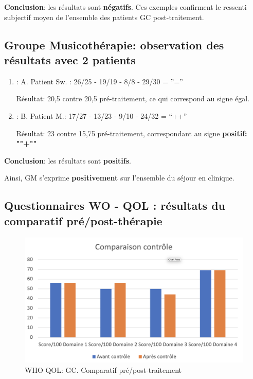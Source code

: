        \textbf{ Conclusion}: les résultats sont \textbf{négatifs}.
        Ces exemples confirment
        le ressenti subjectif moyen de l'ensemble des patients
        GC post-traitement.
        \subsection{Groupe Musicothérapie: observation des résultats avec 2 patients}


\begin{enumerate}
 		\item : A. Patient Sw. : 26/25 - 19/19 - 8/8 - 29/30 =  ''=''



  Résultat: 20,5 contre 20,5 pré-traitement, ce qui
        correspond au signe égal.



 		\item : B. Patient M.: 17/27 - 13/23 -  9/10 - 24/32 = ``++''

              Résultat: 23 contre 15,75 pré-traitement, correspondant
              au signe \textbf{positif: ""+""}
            \end{enumerate}
 \textbf{ Conclusion}: les résultats sont \textbf{positifs}.


                 Ainsi,  GM s'exprime
                 \textbf{positivement}
                 sur l'ensemble du séjour en clinique.

                 \subsection{Questionnaires WO - QOL : résultats du comparatif pré/post-thérapie}



\begin{figure}
\centering
\includegraphics[width=\linewidth]{images/Compcontrole.png}
\caption[Schéma du déroulement]{WHO QOL:  GC. Comparatif pré/post-traitement}

\end{figure}


